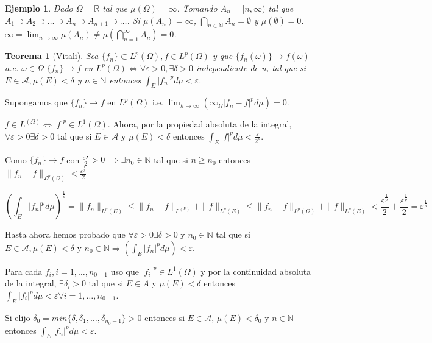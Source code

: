 \documentclass[11pt, a4paper]{article}
\makeatletter
\newif\IfInSansMode
\let\oldsf\sffamily
\renewcommand*{\sffamily}{\oldsf\mathversion{sans}\InSansModetrue}
\let\oldnorm\normalfont
\renewcommand*{\normalfont}{\oldnorm\InSansModefalse\mathversion{normal}}
\newcommand{\R}{\mathbb{R}} \newcommand{\N}{\mathbb{N}}
\renewcommand{\O}{\emptyset}
\renewenvironment{proof}[1][\proofname] {\par\pushQED{\qed}\normalfont\topsep6\p@\@plus6\p@\relax\trivlist\item[\hskip\labelsep\itshape\sffamily#1\@addpunct{.}]\ignorespaces}{\popQED\endtrivlist\@endpefalse}
\theoremstyle{theorem-style}
\newtheorem{nth}{Teorema}[section]
\theoremstyle{definition-style}
\theoremstyle{remark-style}
\theoremstyle{example-style}
\newtheorem{ejemplo}{Ejemplo}[section]
\makeatother
\begin{document}

\begin{ejemplo}
  Dado $\Omega = \R$ tal que $\mu(\Omega) = \infty$. Tomando $A_n = [n,
  \infty)$ tal que $A_1 \supset A_2 \supset \hdots \supset A_n \supset
  A_{n+1} \supset \hdots$. Si $\mu(A_n) = \infty$, $\bigcap_{n\in \N} A_n =
  \O$ y $\mu(\O) = 0$. $\infty = \lim_{n \to \infty} \mu(A_n) \neq
  \mu(\bigcap_{n=1}^{\infty} A_n) = 0$.
\end{ejemplo}

\begin{nth}[Vitali]
  Sea $\{f_n\} \subset L^p(\Omega), f \in L^p(\Omega)$ y que
  $\{f_n(\omega)\} \rightarrow f(\omega)$ a.e. $\omega \in \Omega$ $\{f_n\}
  \rightarrow f$ en $L^p(\Omega) \Leftrightarrow \forall \varepsilon > 0,
  \exists \delta > 0$ independiente de n, tal que si $E \in \mathscr A, \mu(E) <
  \delta$ y $n \in \N$ entonces $\int_E |f_n|^pd\mu < \varepsilon$.
\end{nth}

\begin{proof}
   \boxed{\Rightarrow} Supongamos que $\{f_n\} \rightarrow f$ en $L^p(\Omega)$
   i.e. $\lim_{h \to \infty}(\infty_{\Omega}|f_n - f|^pd\mu) = 0$.

   $f \in L^(\Omega) \Leftrightarrow |f|^p \in L^1(\Omega)$. Ahora, por la
   propiedad absoluta de la integral, $\forall \varepsilon > 0 \exists \delta >
   0$ tal que si $E \in \mathscr A$ y $\mu(E) < \delta$ entonces $\displaystyle \int_E |f|^p d\mu < \frac{\varepsilon}{2^p}$.

   Como $\{f_n\} \rightarrow f$ con  $\frac{\varepsilon^{\frac{1}{p}}}{2} > 0$ $\Rightarrow \exists n_0 \in \N$ tal que si $n
   \geq n_0$ entonces $\|f_n - f\|_{\mathcal L^p(\Omega)} < \frac{\varepsilon^{\frac{1}{p}}}{2}$ 

   $$\left(\int_E |f_n|^p d\mu\right)^{\frac{1}{p}} = \|f_n\|_{ L^p(E)} \leq \|f_n -
   f\|_{ L^(E)}+ \|f\|_{ L^p(E)} \leq \|f_n - f\|_{
     L^p(\Omega)} + \|f\|_{ L^p(E)} <
   \frac{\varepsilon^{\frac{1}{p}}}{2} + \frac{\varepsilon^{\frac{1}{p}}}{2} =
   \varepsilon^{\frac{1}{p}}$$

   Hasta ahora hemos probado que $\forall \varepsilon > 0 \exists \delta > 0$ y
   $n_0 \in \N$ tal que si $E \in \mathscr A, \mu(E) <
  \delta$ y $n_0 \in \N \Rightarrow \left( \int_E|f_n|^p d\mu \right) <
  \varepsilon$.

  Para cada $f_i, i=1, \hdots, n_{0-1}$ uso que $|f_i|^p \in L^1(\Omega)$ y por
  la continuidad absoluta de la integral, $\exists \delta_i > 0$ tal que si $E
  \in A$ y $\mu(E) < \delta$ entonces $\int_E |f_i|^p d\mu < \varepsilon \forall
  i = 1, \hdots , n_{0-1}$.

  Si elijo $\delta_0 = min\{\delta, \delta_1, \hdots, \delta_{n_0 -1}\} > 0$
  entonces si $E \in \mathscr A$, $\mu(E) < \delta_0$ y $n \in \N$ entonces
  $\int_E |f_n|^p d \mu < \varepsilon$.

  \boxed{\Leftarrow}

  
\end{proof}
\end{document}
